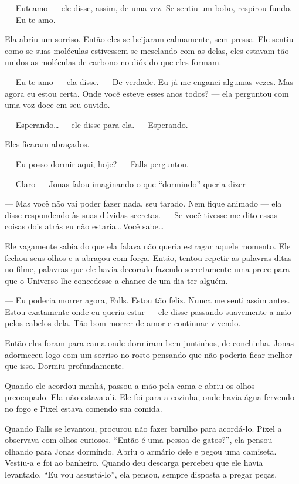 --- Euteamo --- ele disse, assim, de uma vez. Se sentiu um bobo, respirou fundo. --- Eu te amo.

Ela abriu um sorriso. Então eles se beijaram calmamente, sem pressa. Ele sentiu como se suas moléculas estivessem se mesclando com as delas, eles estavam tão unidos  as moléculas de carbono no dióxido que eles formam.

--- Eu te amo --- ela disse. --- De verdade. Eu já me enganei algumas vezes. Mas agora eu estou certa. Onde você esteve esses anos todos? --- ela perguntou com uma voz doce em seu ouvido.

--- Esperando\ldots\,--- ele disse para ela. --- Esperando.

Eles ficaram abraçados.

--- Eu posso dormir aqui, hoje? --- Falls perguntou.

--- Claro --- Jonas falou\mudanca{,} imaginando o que ``dormindo'' queria dizer

--- Mas você não vai poder fazer nada, seu tarado. Nem fique animado --- ela disse\mudanca{,} respondendo às suas dúvidas secretas. --- Se você tivesse me dito essas coisas dois atrás eu não estaria\ldots\,Você sabe\ldots

Ele vagamente sabia do que ela falava não queria estragar aquele momento. Ele fechou seus olhos e a abraçou com força. Então, tentou repetir as palavras ditas no filme, palavras que ele havia decorado fazendo secretamente uma prece para que o Universo lhe concedesse a chance de um dia ter alguém.

--- Eu poderia morrer agora, Falls. Estou tão feliz. Nunca me senti assim antes. Estou exatamente onde eu queria estar --- ele disse\mudanca{,} passando suavemente a mão pelos cabelos dela. Tão bom morrer de amor e continuar vivendo.

Então eles foram para cama onde dormiram bem juntinhos, de conchinha. Jonas adormeceu logo com um sorriso no rosto pensando que não poderia ficar melhor que isso. Dormiu profundamente.

Quando ele acordou   manhã, passou a mão pela cama e abriu os olhos preocupado. Ela não estava ali. Ele foi para a cozinha, onde havia água fervendo no fogo e Pixel estava comendo sua comida.

Quando Falls se levantou, procurou não fazer barulho para acordá-lo. Pixel a observava com olhos curiosos. ``Então é uma pessoa de gatos?'', ela pensou\mudanca{,} olhando para Jonas dormindo. Abriu o armário dele e pegou uma camiseta. Vestiu-a e foi ao banheiro. Quando deu descarga percebeu que ele havia levantado. ``Eu vou assustá-lo'', ela pensou, sempre disposta a pregar peças.

